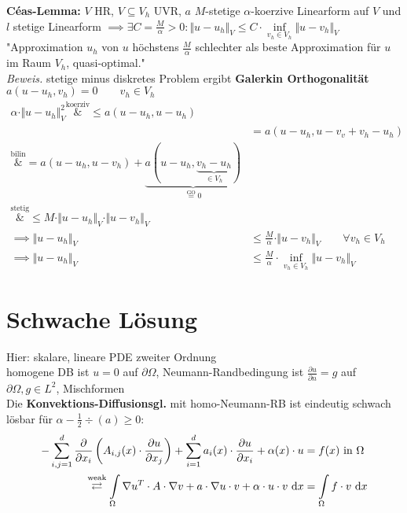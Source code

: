 \documentclass[12pt]{scrartcl}
\begin{document}
	\textbf{Céas-Lemma:} $V$ HR, $V\subseteq V_h$ UVR, $a$ $M$-stetige $\alpha$-koerzive Linearform auf $V$ und $l$ stetige Linearform $\implies\exists C=\frac{M}{\alpha}>0:\Vert u-u_h\Vert_V\leq C\cdot\inf\limits_{v_h\in V_h}\Vert u-v_h\Vert_V$
	"Approximation $u_h$ von $u$ höchstens $\frac{M}{\alpha}$ schlechter als beste Approximation für $u$ im Raum $V_h$, quasi-optimal."\\
	\textit{Beweis.} stetige minus diskretes Problem ergibt \textbf{Galerkin Orthogonalität} 
	$a(u-u_h,v_h)=0\qquad v_h\in V_h$
	\begin{align*}
		\alpha\cdot\Vert u-u_h\Vert^2_V
		\overset{\text{koerziv}}&\leq
		a(u-u_h,u-u_h)\\
		&=a(u-u_h,u-v_v+v_h- u_h)\\
		\overset{\text{bilin}}&=
		a(u-u_h,u-v_h)+\underbrace{a(u-u_h,\underbrace{v_h-u_h}_{\in V_h})}_{\overset{\text{GO}}=0}\\
		\overset{\text{stetig}}&{\leq}
		M\cdot\Vert u-u_h\Vert_V\cdot\Vert u-v_h\Vert_V\\
		\implies
		\Vert u-u_h\Vert_V&\leq\frac{M}{\alpha}\cdot\Vert u-v_h\Vert_V\qquad\forall v_h\in V_h\\
		\implies
		\Vert u-u_h\Vert_V&\leq \frac{M}{\alpha}\cdot\inf\limits_{v_h\in V_h}\Vert u-v_h\Vert_V
	\end{align*}
	
	\section{Schwache Lösung}
	
	Hier: skalare, lineare PDE zweiter Ordnung\\
	homogene DB ist $u=0$ auf $\partial\Omega$, Neumann-Randbedingung ist $\frac{\partial u}{\partial n}=g$ auf $\partial\Omega,g\in L^2$, Mischformen\\
	Die \textbf{Konvektions-Diffusionsgl.} mit homo-Neumann-RB ist eindeutig schwach lösbar für $\alpha-\frac{1}{2}\div(a)\geq0$:
	\begin{align*}
	-\sum\limits_{i,j=1}^d\frac{\partial}{\partial x_i}\left(A_{i,j}(x)\cdot\frac{\partial u}{\partial x_j}\right)+\sum\limits_{i=1}^d a_i(x)\cdot\frac{\partial u}{\partial x_i}+\alpha(x)\cdot u&=f(x)\text{ in }\Omega\\
	\overset{\text{weak}}{\rightleftarrows}
	\int\limits_\Omega\nabla u^T\cdot A\cdot\nabla v+a\cdot\nabla u\cdot v+\alpha\cdot u\cdot v\text{ d} x&=\int\limits_\Omega f\cdot v\text{ d} x
	\end{align*}
	
\end{document}
